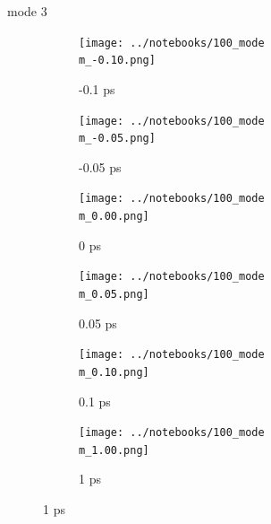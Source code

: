 \documentclass{beamer}
\begin{document}
\renewcommand\m{3}
\begin{frame}{mode \m}
	\begin{figure}
		\centering
		\begin{subfigure}[b]{\w\textwidth}
			\centering
			\texttt{[image: ../notebooks/100\_mode\\m\_-0.10.png]}
			\caption{-0.1 ps}
		\end{subfigure}
		\begin{subfigure}[b]{\w\textwidth}
			\centering
			\texttt{[image: ../notebooks/100\_mode\\m\_-0.05.png]}
			\caption{-0.05 ps}
		\end{subfigure}
		\begin{subfigure}[b]{\w\textwidth}
			\centering
			\texttt{[image: ../notebooks/100\_mode\\m\_0.00.png]}
			\caption{0 ps}
		\end{subfigure}
		\begin{subfigure}[b]{\w\textwidth}
			\centering
			\texttt{[image: ../notebooks/100\_mode\\m\_0.05.png]}
			\caption{0.05 ps}
		\end{subfigure}
		\begin{subfigure}[b]{\w\textwidth}
			\centering
			\texttt{[image: ../notebooks/100\_mode\\m\_0.10.png]}
			\caption{0.1 ps}
		\end{subfigure}
		\begin{subfigure}[b]{\w\textwidth}
			\centering
			\texttt{[image: ../notebooks/100\_mode\\m\_1.00.png]}
			\caption{1 ps}
		\end{subfigure}
	\end{figure}
\end{frame}
\end{document}
